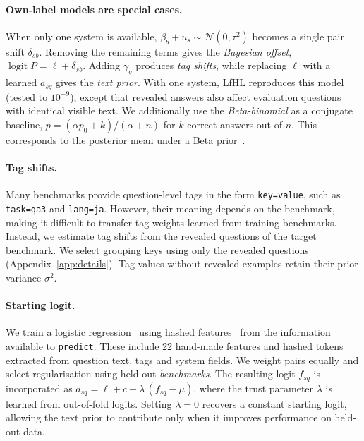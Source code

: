 \documentclass{article}
\newcommand{\lfhl}{LfHL}
\newcommand{\code}[1]{\texttt{#1}}
\newcommand{\N}{\mathcal{N}}
\begin{document}
\paragraph{Own-label models are special cases.} When only one system is available, $\beta_b + u_s \sim \N(0,\tau^2)$ becomes a single pair shift $\delta_{sb}$. Removing the remaining terms gives the \emph{Bayesian offset}, $\operatorname{logit} P = \ell + \delta_{sb}$. Adding $\gamma_g$ produces \emph{tag shifts}, while replacing $\ell$ with a learned $a_{sq}$ gives the \emph{text prior}. With one system, \lfhl{} reproduces this model (tested to $10^{-9}$), except that revealed answers also affect evaluation questions with identical visible text. We additionally use the \emph{Beta-binomial} as a conjugate baseline, $p=(\alpha p_0 + k)/(\alpha+n)$ for $k$ correct answers out of $n$. This corresponds to the posterior mean under a Beta prior~\citep{efron1975data}.

\paragraph{Tag shifts.} Many benchmarks provide question-level tags in the form \code{key=value}, such as \code{task=qa3} and \code{lang=ja}. However, their meaning depends on the benchmark, making it difficult to transfer tag weights learned from training benchmarks. Instead, we estimate tag shifts from the revealed questions of the target benchmark. We select grouping keys using only the revealed questions (Appendix~\ref{app:details}). Tag values without revealed examples retain their prior variance $\sigma^2$.

\paragraph{Starting logit.} We train a logistic regression~\citep{scikit-learn} using hashed features~\citep{Weinberger2009Feature} from the information available to \code{predict}. These include 22 hand-made features and hashed tokens extracted from question text, tags and system fields. We weight pairs equally and select regularisation using held-out \emph{benchmarks}. The resulting logit $f_{sq}$ is incorporated as $a_{sq} = \ell + c + \lambda\,(f_{sq} - \mu)$, where the trust parameter $\lambda$ is learned from out-of-fold logits. Setting $\lambda = 0$ recovers a constant starting logit, allowing the text prior to contribute only when it improves performance on held-out data.
\end{document}
